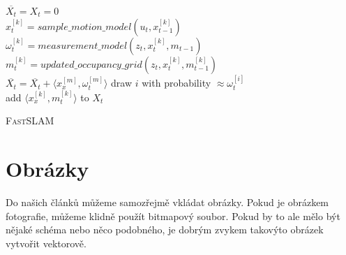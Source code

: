 \documentclass[11pt]{article}
\begin{document}
        \begin{algorithm}[h] \label{alg1}
            \SetAlgoNoLine
            \LinesNumbered
            \SetNlSkip{-1em}
            \SetNlSty{}{}{:}
            \BlankLine
            \Indp
            $\overline{X_{t}}=X_{t}=0$\\
             {
                $x_{t}^{[k]} = sample\_motion\_model (u_{t}, x_{t-1}^{[k]})$ \\
                $\omega_{t}^{[k]} = measurement\_model(z_{t}, x_{t}^{[k]}, m_{t-1})$\\
                $m_{t}^{[k]} = updated\_occupancy\_grid (z_{t}, x_{t}^{[k]}, m_{t-1}^{[k]})$\\
                $\overline{X_{t}} = \overline{X_{t}} + \langle x_{x}^{[m]}, \omega_{t}^{[m]}\rangle$
            }
             {
                draw $i$ with probability $\approx \omega_{t}^{[i]}$\\
                add $\langle x_{x}^{[k]}, m_{t}^{[k]}\rangle$ to $X_{t}$
            }
            \caption{\textsc{FastSLAM}}
        \end{algorithm}
    
    \section{Obrázky}
    Do našich článků můžeme samozřejmě vkládat obrázky. Pokud je obrázkem fotografie, můžeme klidně použít bitmapový soubor. Pokud by to ale mělo být nějaké schéma nebo něco podobného, je dobrým zvykem takovýto obrázek vytvořit vektorově.
    
\end{document}
